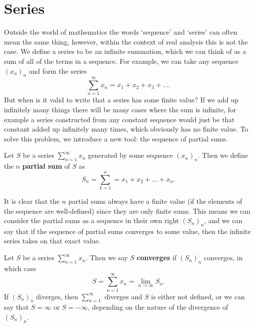 \documentclass[../real_analysis.tex]{subfiles}
\begin{document}
    \section{Series}
        Outside the world of mathematics the words `sequence' and `series' can often mean the same thing, however, within the context of real analysis this is not the case. We define a series to be an infinite summation, which we can think of as a sum of all of the terms in a sequence. For example, we can take any sequence $(x_n)_n$ and form the series
        \begin{equation}
            \sum_{n=1}^\infty x_n=x_1+x_2+x_3+\dots.
        \end{equation}
        But when is it valid to write that a series has some finite value? If we add up infinitely many things there will be many cases where the sum is infinite, for example a series constructed from any constant sequence would just be that constant added up infinitely many times, which obviously has no finite value. To solve this problem, we introduce a new tool: the sequence of partial sums.
        \begin{definition}
            Let $S$ be a series $\sum_{n=1}^\infty x_n$ generated by some sequence $(x_n)_n$. Then we define the $n$ \textbf{partial sum} of $S$ as
            \begin{equation}
                S_n=\sum_{k=1}^n=x_1+x_2+\dots+x_n.
            \end{equation}
        \end{definition}
        It is clear that the $n$ partial sums always have a finite value (if the elements of the sequence are well-defined) since they are only finite sums. This means we can consider the partial sums as a sequence in their own right $(S_n)_n$, and we can say that if the sequence of partial sums converges to some value, then the infinite series takes on that exact value.
        \begin{definition}
            Let $S$ be a series $\sum_{n=1}^\infty x_n$. Then we say $S$ \textbf{converges} if $(S_n)_n$ converges, in which case
            \begin{equation}
                S=\sum_{n=1}^\infty x_n=\lim_{n\to\infty}S_n.
            \end{equation}
            If $(S_n)_n$ diverges, then $\sum_{n=1}^\infty$ diverges and $S$ is either not defined, or we can say that $S=\infty$ or $S=-\infty$, depending on the nature of the divergence of $(S_n)_n$.
        \end{definition}
\end{document}
